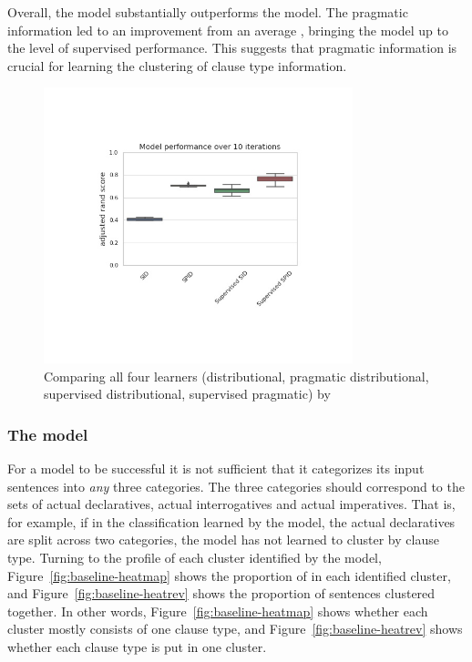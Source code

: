 Overall, the \plearnerabbr{} model substantially outperforms the \dlearnerabbr{} model. The pragmatic information led to an improvement from an average , bringing the model up to the level of supervised performance. This suggests that pragmatic information is crucial for learning the clustering of clause type information. 


\begin{figure}[H]
    \centering
    \includegraphics[width=0.8\textwidth]{figures/compare-all-rand.jpg}
    \caption{Comparing all four learners (distributional, pragmatic distributional, supervised distributional, supervised pragmatic) by  }
    \label{fig:compare-rand}
\end{figure}


\subsubsection{The \dlearnerabbr{} model}
\label{sec:engcl:model:results:d}
For a model to be successful it is not sufficient that it categorizes its input sentences into \emph{any} three categories. The three categories should correspond to the sets of actual declaratives, actual interrogatives and actual imperatives. That is, for example, if in the classification learned by the model, the actual declaratives are split across two categories, the model has not learned to cluster by clause type.
Turning to the profile of each cluster identified by the \dlearnerabbr{} model, Figure~\ref{fig:baseline-heatmap} shows the proportion of \diis{} in each identified cluster, and Figure~\ref{fig:baseline-heatrev} shows the proportion of sentences clustered together. In other words, Figure~\ref{fig:baseline-heatmap} shows whether each cluster mostly consists of one clause type, and Figure~\ref{fig:baseline-heatrev} shows whether each clause type is put in one cluster.  



